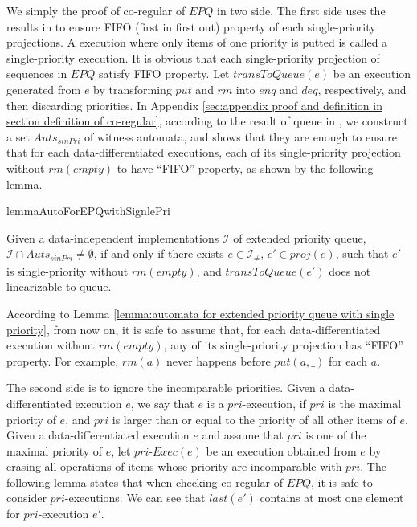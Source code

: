 We simply the proof of co-regular of $\textit{EPQ}$ in two side. The first side uses the results in \cite{Bouajjani:2015} to ensure FIFO (first in first out) property of each single-priority projections. A execution where only items of one priority is putted is called a single-priority execution. It is obvious that each single-priority projection of sequences in $\textit{EPQ}$ satisfy FIFO property. Let $\textit{transToQueue}(e)$ be an execution generated from $e$ by transforming $\textit{put}$ and $\textit{rm}$ into $\textit{enq}$ and $\textit{deq}$, respectively, and then discarding priorities. In Appendix \ref{sec:appendix proof and definition in section definition of co-regular}, according to the result of queue in \cite{Bouajjani:2015}, we construct a set $\textit{Auts}_{\textit{sinPri}}$ of witness automata, and shows that they are enough to ensure that for each data-differentiated executions, each of its single-priority projection without $\textit{rm}(\textit{empty})$ to have ``FIFO'' property, as shown by the following lemma.

\begin{restatable}{lemma}{AutoForEPQwithSignlePri}
\label{lemma:automata for extended priority queue with single priority}

Given a data-independent implementations $\mathcal{I}$ of extended priority queue, $\mathcal{I} \cap \textit{Auts}_{\textit{sinPri}} \neq \emptyset$, if and only if there exists $e \in \mathcal{I}_{\neq}$, $e' \in \textit{proj}(e)$, such that $e'$ is single-priority  without $\textit{rm}(\textit{empty})$, and $\textit{transToQueue}(e')$ does not linearizable to queue.
\end{restatable}

According to Lemma \ref{lemma:automata for extended priority queue with single priority}, from now on, it is safe to assume that, for each data-differentiated execution without $\textit{rm}(\textit{empty})$, any of its single-priority projection has ``FIFO'' property. For example, $\textit{rm}(a)$ never happens before $\textit{put}(a,\_)$ for each $a$.

The second side is to ignore the incomparable priorities. Given a data-differentiated execution $e$, we say that $e$ is a $\textit{pri}$-execution, if $\textit{pri}$ is the maximal priority of $e$, and $\textit{pri}$ is larger than or equal to the priority of all other items of $e$. Given a data-differentiated execution $e$ and assume that $\textit{pri}$ is one of the maximal priority of $e$, let $\textit{pri-Exec}(e)$ be an execution obtained from $e$ by erasing all operations of items whose priority are incomparable with $\textit{pri}$. The following lemma states that when checking co-regular of $\textit{EPQ}$, it is safe to consider $\textit{pri}$-executions. We can see that $\textit{last}(e')$ contains at most one element for $\textit{pri}$-execution $e'$.

